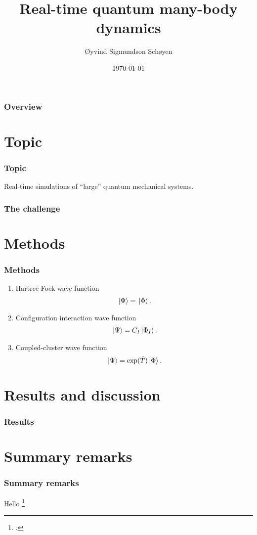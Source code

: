 \documentclass{beamer}
\author{Øyvind Sigmundson Schøyen}
\title{Real-time quantum many-body dynamics}
\institute{University of Oslo}
\date{\today}
\begin{document}
\begin{frame}
    \titlepage
\end{frame}
\begin{frame}
    \frametitle{Overview}
    \tableofcontents
\end{frame}

\section{Topic}

\begin{frame}
    \frametitle{Topic}
    Real-time simulations of ``large'' quantum mechanical systems.
\end{frame}

\begin{frame}
    \frametitle{The challenge}
\end{frame}

\section{Methods}

\begin{frame}
    \frametitle{Methods}
    \begin{enumerate}
        \item Hartree-Fock wave function
            \begin{align}
                \ket*{\Psi} = \ket*{\Phi}.
            \end{align}
        \item Configuration interaction wave function
            \begin{align}
                \ket*{\Psi} = C_{I}\ket*{\Phi_I}.
            \end{align}
        \item Coupled-cluster wave function
            \begin{align}
                \ket*{\Psi} = \exponential(\clust)\ket*{\slat}.
            \end{align}
    \end{enumerate}
\end{frame}

\begin{frame}
\end{frame}

\section{Results and discussion}

\begin{frame}
    \frametitle{Results}
\end{frame}

\section{Summary remarks}

\begin{frame}
    \frametitle{Summary remarks}
\end{frame}

\begin{frame}
    Hello \footcite{pedersen2018symplectic}
\end{frame}
\end{document}
